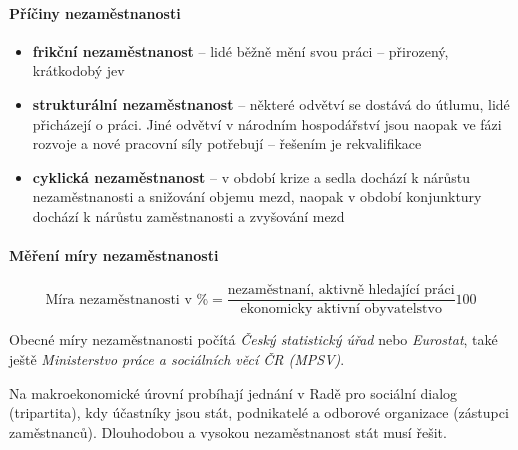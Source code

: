 \paragraph{Příčiny nezaměstnanosti}
\begin{itemize}
    \item \textbf{frikční nezaměstnanost} -- lidé běžně mění svou práci -- přirozený, krátkodobý jev
    \item \textbf{strukturální nezaměstnanost} -- některé odvětví se dostává do útlumu, lidé přicházejí o práci. Jiné odvětví v národním hospodářství jsou naopak ve fázi rozvoje a nové pracovní síly potřebují -- řešením je rekvalifikace
    \item \textbf{cyklická nezaměstnanost} -- v období krize a sedla dochází k nárůstu nezaměstnanosti a snižování objemu mezd, naopak v období konjunktury dochází k nárůstu zaměstnanosti a zvyšování mezd
\end{itemize}

\paragraph{Měření míry nezaměstnanosti}
\begin{displaymath}
    \text{Míra nezaměstnanosti v \%} = \frac{\text{nezaměstnaní, aktivně hledající práci}}{\text{ekonomicky aktivní obyvatelstvo}} 100
\end{displaymath}

Obecné míry nezaměstnanosti počítá \textit{Český statistický úřad} nebo \textit{Eurostat}, také ještě \textit{Ministerstvo práce a sociálních věcí ČR (MPSV)}.

Na makroekonomické úrovní probíhají jednání v Radě pro sociální dialog (tripartita), kdy účastníky jsou stát, podnikatelé a odborové organizace (zástupci zaměstnanců). Dlouhodobou a vysokou nezaměstnanost stát musí řešit.

